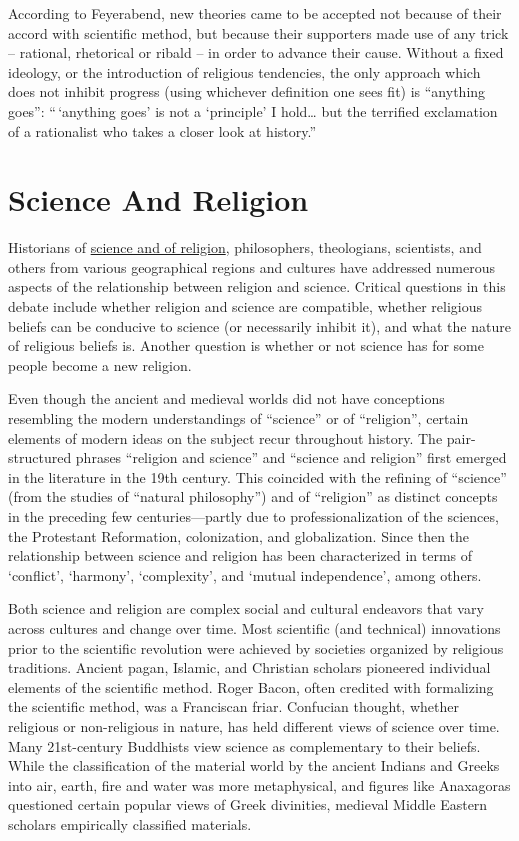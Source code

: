 According to Feyerabend, new theories came to be accepted not because of their accord with scientific method, but because their supporters made use of any trick -- rational, rhetorical or ribald -- in order to advance their cause. Without a fixed ideology, or the introduction of religious tendencies, the only approach which does not inhibit progress (using whichever definition one sees fit) is ``anything goes'': ``\,`anything goes' is not a `principle' I hold\ldots{} but the terrified exclamation of a rationalist who takes a closer look at history.''

\hypertarget{science-and-religion}{%
\section{Science And Religion}\label{science-and-religion}}

Historians of \href{https://en.wikipedia.org/wiki/Relationship_between_religion_and_science}{science and of religion}, philosophers, theologians, scientists, and others from various geographical regions and cultures have addressed numerous aspects of the relationship between religion and science. Critical questions in this debate include whether religion and science are compatible, whether religious beliefs can be conducive to science (or necessarily inhibit it), and what the nature of religious beliefs is. Another question is whether or not science has for some people become a new religion.

Even though the ancient and medieval worlds did not have conceptions resembling the modern understandings of ``science'' or of ``religion'', certain elements of modern ideas on the subject recur throughout history. The pair-structured phrases ``religion and science'' and ``science and religion'' first emerged in the literature in the 19th century. This coincided with the refining of ``science'' (from the studies of ``natural philosophy'') and of ``religion'' as distinct concepts in the preceding few centuries---partly due to professionalization of the sciences, the Protestant Reformation, colonization, and globalization. Since then the relationship between science and religion has been characterized in terms of `conflict', `harmony', `complexity', and `mutual independence', among others.

Both science and religion are complex social and cultural endeavors that vary across cultures and change over time. Most scientific (and technical) innovations prior to the scientific revolution were achieved by societies organized by religious traditions. Ancient pagan, Islamic, and Christian scholars pioneered individual elements of the scientific method. Roger Bacon, often credited with formalizing the scientific method, was a Franciscan friar. Confucian thought, whether religious or non-religious in nature, has held different views of science over time. Many 21st-century Buddhists view science as complementary to their beliefs. While the classification of the material world by the ancient Indians and Greeks into air, earth, fire and water was more metaphysical, and figures like Anaxagoras questioned certain popular views of Greek divinities, medieval Middle Eastern scholars empirically classified materials.

